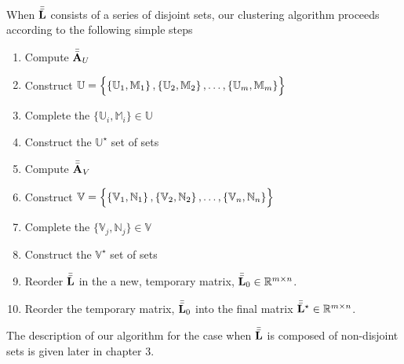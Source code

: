 \documentclass[../../ClusteringConnectionsMAIN.tex]{subfiles}
\begin{document}
\begin{flushleft}
\begin{large}

When $\bar{\bar{\mathbf{L}}}$ consists of a series of disjoint sets, our clustering algorithm proceeds according to the following simple steps

\begin{enumerate}
\item Compute $\bar{\bar{\mathbf{A}}}_U$
\item Construct $\mathbb{U} = \Bigl\{ \left\{ \mathbb{U}_1, \mathbb{M}_1 \right\}, \left\{ \mathbb{U}_2, \mathbb{M}_2 \right\}, \dots, \left\{ \mathbb{U}_m, \mathbb{M}_m \right\} \Bigr\}$
\item Complete the $\bigl\{ \mathbb{U}_i, \mathbb{M}_i \bigr\} \in \mathbb{U}$
\item Construct the $\mathbb{U}^\star$ set of sets
\item Compute $\bar{\bar{\mathbf{A}}}_V$
\item Construct $\mathbb{V} = \Bigl\{ \left\{ \mathbb{V}_1, \mathbb{N}_1 \right\}, \left\{ \mathbb{V}_2, \mathbb{N}_2 \right\}, \dots, \left\{ \mathbb{V}_n, \mathbb{N}_n \right\} \Bigr\}$
\item Complete the $\bigl\{ \mathbb{V}_j, \mathbb{N}_j \bigr\} \in \mathbb{V}$
\item Construct the $\mathbb{V}^\star$ set of sets
\item Reorder $\bar{\bar{\mathbf{L}}}$ in the a new, temporary matrix, $\bar{\bar{\mathbf{L}}}_0 \in \mathbb{R}^{m \times n}$.
\item Reorder the temporary matrix, $\bar{\bar{\mathbf{L}}}_0$ into the final matrix $\bar{\bar{\mathbf{L}}}^\star \in \mathbb{R}^{m \times n}$.
\end{enumerate}

The description of our algorithm for the case when $\bar{\bar{\mathbf{L}}}$ is composed of non-disjoint sets is given later in chapter 3.


\end{large}
\end{flushleft}
\end{document}
